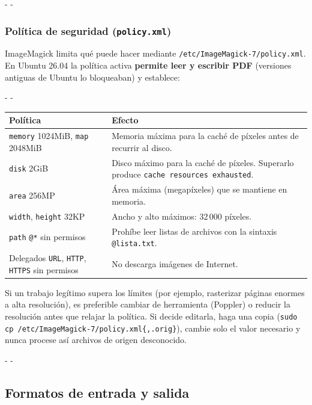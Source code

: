 \documentclass[11pt,a4paper]{article}
\makeatletter
\newcommand{\necesitaespacio}[1]{\par\penalty-100\begingroup
	\setlength{\dimen@}{#1}\dimen@ii\pagegoal\advance\dimen@ii-\pagetotal
	\ifdim\dimen@>\dimen@ii\ifdim\dimen@ii>\z@\vfil\fi\penalty-\@M\fi\endgroup}
\newcommand{\cmd}[1]{\texttt{\textcolor{colcmd}{#1}}}      %
\newcommand{\arch}[1]{\texttt{\textcolor{colarch}{#1}}}    %
\newcommand{\cab}[1]{\textbf{#1}}
\makeatother
\begin{document}
	\necesitaespacio{22\baselineskip}
	\subsubsection{Política de seguridad (\texttt{policy.xml})}\label{sec:im-policy}
	
	ImageMagick limita qué puede hacer mediante \arch{/\allowbreak{}etc/\allowbreak{}ImageMagick-\allowbreak{}7/\allowbreak{}policy.xml}. En Ubuntu 26.04 la política activa \textbf{permite leer y escribir PDF} (versiones antiguas de Ubuntu lo bloqueaban) y establece:
	
	\begingroup\small
	\necesitaespacio{18\baselineskip}
	\begin{longtable}{L{4.6cm}L{10.46cm}}
		\toprule{}\cab{Política} & \cab{Efecto}\\\midrule
		\endfirsthead
		\bottomrule
		\endfoot
		\texttt{memory} 1024MiB, \texttt{map} 2048MiB & Memoria máxima para la caché de píxeles antes de recurrir al disco.\\*
		\texttt{disk} 2GiB & Disco máximo para la caché de píxeles. Superarlo produce \texttt{cache resources exhausted}.\\
		\texttt{area} 256MP & Área máxima (megapíxeles) que se mantiene en memoria.\\
		\texttt{width}, \texttt{height} 32KP & Ancho y alto máximos: 32\,000 píxeles.\\
		\texttt{path} \texttt{@*} sin permisos & Prohíbe leer listas de archivos con la sintaxis \arch{@lista.txt}.\\*
		Delegados \texttt{URL}, \texttt{HTTP}, \texttt{HTTPS} sin permisos & No descarga imágenes de Internet.\\
	\end{longtable}
	\endgroup
	
	\begin{advertencia}
		Si un trabajo legítimo supera los límites (por ejemplo, rasterizar páginas enormes a alta resolución), es preferible cambiar de herramienta (Poppler) o reducir la resolución antes que relajar la política. Si decide editarla, haga una copia (\cmd{sudo cp /\allowbreak{}etc/\allowbreak{}ImageMagick-\allowbreak{}7/\allowbreak{}policy.xml\{,\allowbreak{}.orig\}}), cambie solo el valor necesario y nunca procese así archivos de origen desconocido.
	\end{advertencia}
	
	\necesitaespacio{26\baselineskip}
	\subsection{Formatos de entrada y salida}
	
\end{document}
